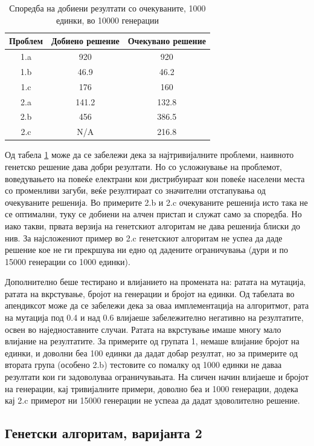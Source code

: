 \documentclass{article}
\begin{document}
\begin{table}[h!]
\centering
\begin{tabular}{||c c c||} 
 \hline
 Проблем & Добиено решение & Очекувано решение \\ [0.5ex]
 \hline\hline
 1.a & 920 & 920\\ 
 1.b & 46.9 & 46.2 \\
 1.c & 176 & 160 \\
 2.a & 141.2 & 132.8 \\
 2.b & 456 & 386.5 \\
 2.c & N/A & 216.8 \\ [1ex] 
 \hline
\end{tabular}
\caption{Споредба на добиени резултати со очекуваните, 1000 единки, во 10000 генерации}
\label{table_rez_ver1}
\end{table}



Од табела \ref{table_rez_ver1} може да се забележи дека за најтривијалните проблеми, наивното генетско решение дава добри резултати. Но со усложнување на проблемот, воведувањето на повеќе електрани кои дистрибуираат кон повеќе населени места со променливи загуби, веќе резултираат со значителни отстапувања од очекуваните решенија. Во примерите 2.b и 2.c очекуваните решенија исто така не се оптимални, туку се добиени на алчен пристап и служат само за споредба. Но иако такви, првата верзија на генетскиот алгоритам не дава решенија блиски до нив. За најсложениот пример во 2.c генетскиот алгоритам не успеа да даде решение кое не ги прекршува ни едно од дадените ограничувања (дури и по 15000 генерации со 1000 единки). 

Дополнително беше тестирано и влијанието на промената на: ратата на мутација, ратата на вкрстување, бројот на генерации и бројот на единки. Од табелата во апендиксот може да се забележи дека за оваа имплементација на алгоритмот, рата на мутација под 0.4 и над 0.6 влијаеше забележително негативно на резултатите, освен во наједноставните случаи. Ратата на вкрстување имаше многу мало влијание на резултатите. За примерите од групата 1, немаше влијание бројот на единки, и доволни беа 100 единки да дадат добар резултат, но за примерите од втората група (особено 2.b) тестовите со помалку од 1000 единки не даваа резултати кои ги задоволуваа ограничувањата. На сличен начин влијаеше и бројот на генерации, кај тривијалните примери, доволно беа и 1000 генерации, додека кај  2.c примерот ни 15000 генерации не успеаа да дадат здоволително решение.

\subsection{Генетски алгоритам, варијанта 2}
\end{document}
